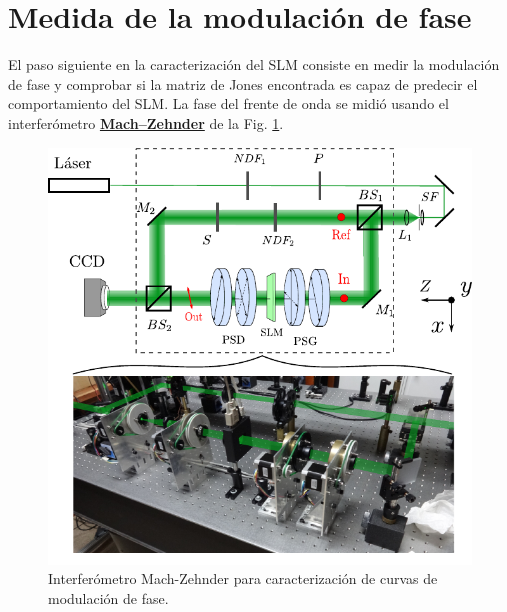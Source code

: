 \section{Medida de la modulación de fase}
El paso siguiente en la caracterización del SLM consiste en medir la
modulación de fase y comprobar si la matriz de Jones encontrada es
capaz de predecir el comportamiento del SLM. 
La fase del frente de onda se midió usando el interferómetro
\href{http://en.wikipedia.org/wiki/Mach–Zehnder_interferometer}{\bf{Mach–Zehnder}}
de la Fig. \ref{fig:mach_zehnder}. 
\begin{figure}[h!]
\centering
\includegraphics[scale=1.1]{mach_zehnder.pdf}
\caption[Interferómetro Mach-Zehnder para caracterización de curvas de
modulación de fase]{Interferómetro Mach-Zehnder para caracterización de curvas de
modulación de fase. }
\label{fig:mach_zehnder}
\end{figure}


